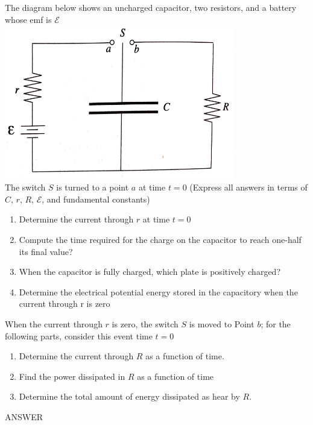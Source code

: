 \documentclass[10pt]{examdesign}
\begin{document}
	\begin{shortanswer}[title={Free Response},rearrange=no,resetcounter=no]
		\begin{question}
				The diagram below shows an uncharged capacitor, two resistors, and a battery whose emf is $ \mathcal{E} $ \\
				\includegraphics[width=10cm]{c1}
				\\
				The switch $ S $ is turned to a point $ a $ at time $ t = 0 $ 
				(Express all answers in terms of $ C $, $ r $, $ R $, $ \mathcal{E} $, and fundamental constants)
				\begin{enumerate}
					\item Determine the current through $ r $ at time $ t = 0 $
					\item Compute the time required for the charge on the capacitor to reach one-half its final value?
					\item When the capacitor is fully charged, which plate is positively charged? 
					\item Determine the electrical potential energy stored in the capacitory when the current through r is zero
				\end{enumerate}
				When the current through $ r $ is zero, the switch $ S $ is moved to Point $ b $; for the following parts, consider this event time $ t = 0 $
				\begin{enumerate}
					\item Determine the current through $ R $ as a function of time. 
					\item Find the power dissipated in $ R $ as a function of time 
					\item Determine the total amount of energy dissipated as hear by $ R $.
				\end{enumerate}
			\begin{answer}
				ANSWER
				\begin{enumerate}

\end{enumerate}
\end{answer}
\end{question}
\end{shortanswer}
\end{document}
